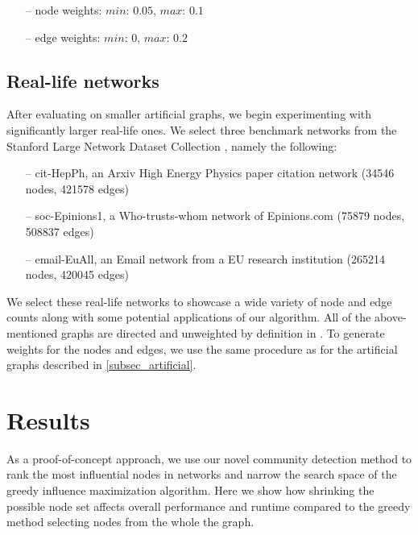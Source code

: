 \documentclass[pdflatex,sn-mathphys-num]{sn-jnl}
\begin{document}
\begin{itemize}
    \item[--] node weights: $min$: $0.05$, $max$: $0.1$
    \item[--] edge weights: $min$: $0$, $max$: $0.2$
\end{itemize}


\subsection{Real-life networks}\label{subsec_reallife}

After evaluating on smaller artificial graphs, we begin experimenting with significantly larger real-life ones. We select three benchmark networks from the Stanford Large Network Dataset Collection \cite{stanfordlarge}, namely the following:

\begin{itemize}
    \item[--] cit-HepPh, an Arxiv High Energy Physics paper citation network (34546 nodes, 421578 edges)
    \item[--] soc-Epinions1, a Who-trusts-whom network of Epinions.com (75879 nodes, 508837 edges)
    \item[--] email-EuAll, an Email network from a EU research institution (265214 nodes, 420045 edges)
\end{itemize}

We select these real-life networks to showcase a wide variety of node and edge counts along with some potential applications of our algorithm. All of the above-mentioned graphs are directed and unweighted by definition in \cite{stanfordlarge}. To generate weights for the nodes and edges, we use the same procedure as for the artificial graphs described in \ref{subsec_artificial}.


\section{Results}\label{sec_results}

As a proof-of-concept approach, we use our novel community detection method to rank the most influential nodes in networks and narrow the search space of the greedy influence maximization algorithm. Here we show how shrinking the possible node set affects overall performance and runtime compared to the greedy method selecting nodes from the whole the graph.
\end{document}
